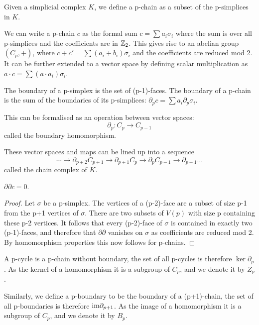 \begin{definition}
    Given a simplicial complex $K$, we define a p-chain as a subset of the p-simplices in $K$. 
\end{definition}

We can write a p-chain $c$ as the formal sum $c = \sum a_i \sigma_i$ where the sum is over all p-simplices and the coefficients are in $\mathbb{Z}_2$. This gives rise to an abelian group $(C_p, +)$, where $c + c' = \sum (a_i + b_i) \sigma_i$ and the coefficients are reduced mod 2. It can be further extended to a vector space by defining scalar multiplication as $a \cdot c = \sum (a \cdot a_i) \sigma_i$.

The boundary of a p-simplex is the set of (p-1)-faces. The boundary of a p-chain is the sum of the boundaries of its p-simplices: $\partial_p c = \sum a_i \partial_p \sigma_i$.

\begin{definition}
    This can be formalised as an operation between vector spaces: 
    $$
    \partial_p: C_p \rightarrow C_{p-1}
    $$ 
    called the boundary homomorphism.
\end{definition}

These vector spaces and maps can be lined up into a sequence
$$
\cdots \rightarrow{\partial_{p+2}} C_{p+1} 
       \rightarrow{\partial_{p+1}} C_p
       \rightarrow{\partial_{p}} C_{p-1}
       \rightarrow{\partial_{p-1}} \ldots
$$
called the chain complex of $K$.

\begin{proposition}
    $\partial \partial c = 0$.
\end{proposition}

\begin{proof}
    Let $\sigma$ be a p-simplex. The vertices of a (p-2)-face are a subset of size p-1 from the p+1 vertices of $\sigma$. There are two subsets of $V(p)$ with size p containing these p-2 vertices. It follows that every (p-2)-face of $\sigma$ is contained in exactly two (p-1)-faces, and therefore that $\partial \partial$ vanishes on $\sigma$ as coefficients are reduced mod 2. By homomorphism properties this now follows for p-chains.
\end{proof}

\begin{definition}
    A p-cycle is a p-chain without boundary, the set of all p-cycles is therefore $\ker \partial_p$. As the kernel of a homomorphism it is a subgroup of $C_p$, and we denote it by $Z_p$.

    Similarly, we define a p-boundary to be the boundary of a (p+1)-chain, the set of all p-boundaries is therefore $\textrm{im} \partial_{p+1}$. As the image of a homomorphism it is a subgroup of $C_p$, and we denote it by $B_p$.
\end{definition}

